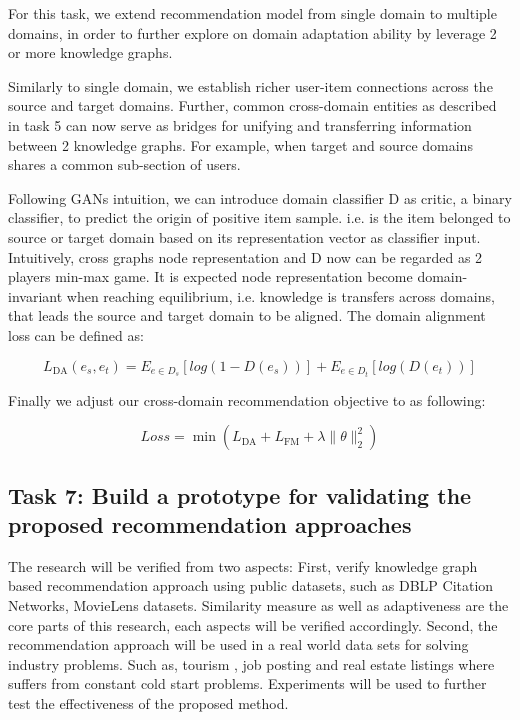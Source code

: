 For this task, we extend recommendation model from single domain to multiple domains, in order to further explore on domain adaptation ability by leverage 2 or more knowledge graphs.

Similarly to single domain, we establish richer user-item connections across the source and target domains. Further, common cross-domain entities as described in task 5 can now serve as bridges for unifying and transferring information between 2 knowledge graphs.
For example, when target and source domains shares a common sub-section of users.

Following GANs intuition, we can introduce domain classifier D as critic, a binary classifier, to predict the origin of positive item sample. i.e. is the item belonged to source or target domain based on its representation vector as classifier input. Intuitively, cross graphs node representation and D now can be regarded as 2 players min-max game. It is expected node representation become domain-invariant when reaching equilibrium, i.e. knowledge is transfers across domains, that leads the source and target domain to be aligned. The domain alignment loss can be defined as:

\begin{equation}
    L_\text{DA}(e_s,e_t)=E_{e \in D_s}[log(1-D(e_s))] + E_{e \in D_t}[log(D(e_t))]
\end{equation}

Finally we adjust our cross-domain recommendation objective to as following:

\begin{equation}
    Loss=\min{(L_\text{DA}+L_\text{FM}+\lambda\|\theta\|^2_2)}
\end{equation}



\subsection*{Task 7: Build a prototype for validating the proposed recommendation approaches}

The research will be verified from two aspects:
First, verify knowledge graph based recommendation approach using public datasets, such as DBLP Citation Networks, MovieLens datasets. Similarity measure as well as adaptiveness are the core parts of this research, each aspects will be verified accordingly.
Second, the recommendation approach will be used in a real world data sets for solving industry problems. Such as, tourism , job posting and real estate listings where suffers from constant cold start problems. Experiments will be used to further test the effectiveness of the proposed method.

